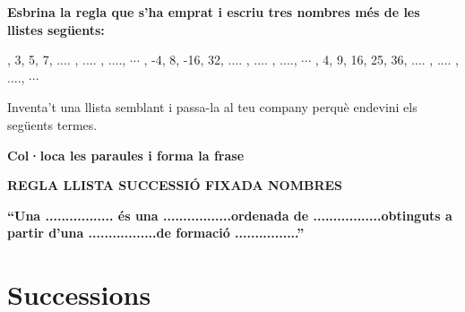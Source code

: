 

\vspace*{\fill}


\begin{iniaval}
 \textbf{Esbrina la regla que s'ha emprat i escriu tres nombres més de les llistes següents:}

\begin{tasks}
	, 3, 5, 7, .... , .... , ....,  $\cdots$
	, -4, 8, -16, 32, .... , .... , ....,  $\cdots$
	, 4, 9, 16, 25, 36, .... , .... , ....,  $\cdots$
\end{tasks}

\vspace{0.25cm}
\quad Inventa't una llista semblant i passa-la al teu company perquè endevini els següents termes.
\vspace{0.25cm}

 \textbf{Col·loca les paraules i forma la frase}
\vspace{0.5cm}
\begin{center}
 \textbf{REGLA \qquad\qquad LLISTA  \qquad\qquad  SUCCESSIÓ  \qquad\qquad  FIXADA  \qquad\qquad NOMBRES}
\end{center}
\vspace{0.5cm}
 \textbf{``Una ................. és una .................ordenada de .................obtinguts a partir d'una .................de formació ................''}

\vso
 
\end{iniaval}

\vspace*{\fill}

\pagebreak
\section{ Successions}

